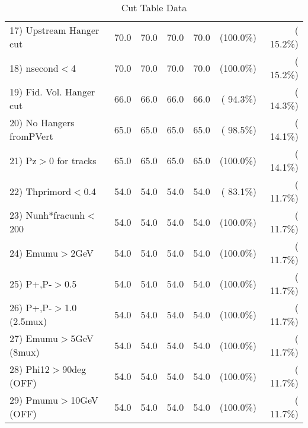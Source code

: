 \begin{table}[h!]
\begin{tabular}{||l||r|r|r|r|r|r||}
 17) Upstream Hanger cut  &         70.0 &         70.0 &         70.0 &         70.0 & (100.0\%) & ( 15.2\%) \\
 18) nsecond$<$4          &         70.0 &         70.0 &         70.0 &         70.0 & (100.0\%) & ( 15.2\%) \\
 19) Fid. Vol. Hanger cut &         66.0 &         66.0 &         66.0 &         66.0 & ( 94.3\%) & ( 14.3\%) \\
 20) No Hangers fromPVert &         65.0 &         65.0 &         65.0 &         65.0 & ( 98.5\%) & ( 14.1\%) \\
 21) Pz$>$0 for tracks    &         65.0 &         65.0 &         65.0 &         65.0 & (100.0\%) & ( 14.1\%) \\
 22) Thprimord$<$0.4      &         54.0 &         54.0 &         54.0 &         54.0 & ( 83.1\%) & ( 11.7\%) \\
 23) Nunh*fracunh$<$200   &         54.0 &         54.0 &         54.0 &         54.0 & (100.0\%) & ( 11.7\%) \\
 24) Emumu$>$2GeV         &         54.0 &         54.0 &         54.0 &         54.0 & (100.0\%) & ( 11.7\%) \\
 25) P+,P-$>$0.5          &         54.0 &         54.0 &         54.0 &         54.0 & (100.0\%) & ( 11.7\%) \\
 26) P+,P-$>$1.0 (2.5mux) &         54.0 &         54.0 &         54.0 &         54.0 & (100.0\%) & ( 11.7\%) \\
 27) Emumu$>$5GeV  (8mux) &         54.0 &         54.0 &         54.0 &         54.0 & (100.0\%) & ( 11.7\%) \\
 28) Phi12$>$90deg  (OFF) &         54.0 &         54.0 &         54.0 &         54.0 & (100.0\%) & ( 11.7\%) \\
 29) Pmumu$>$10GeV  (OFF) &         54.0 &         54.0 &         54.0 &         54.0 & (100.0\%) & ( 11.7\%) \\
 \hline
 \hline
 \end{tabular}
 \caption{Cut Table  Data     }
 \label{tab-cutcohjpsi-mumu_data}
 \end{table}
